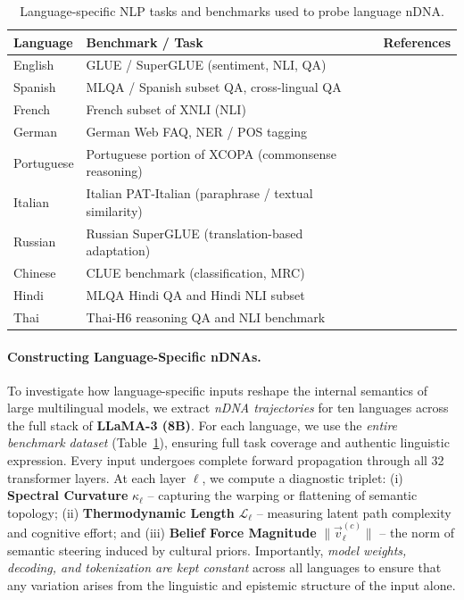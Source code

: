 \begin{table}[htbp]
\centering
\scriptsize
\caption{Language-specific NLP tasks and benchmarks used to probe language nDNA.}
\label{tab:ndna_lang_tasks}
\begin{tabular}{@{}p{2cm} p{4.5cm} p{5cm}@{}}
\toprule
\textbf{Language} & \textbf{Benchmark / Task} & \textbf{References} \\
\midrule
English & GLUE / SuperGLUE (sentiment, NLI, QA) & \cite{wang2018glue, wang2019superglue} \\
Spanish & MLQA / Spanish subset QA, cross-lingual QA & \cite{lewis2019mlqa, barrachina2019opus} \\
French & French subset of XNLI (NLI) & \cite{conneau2018xnli} \\
German & German Web FAQ, NER / POS tagging & \cite{ziems2016germaleval} \\
Portuguese & Portuguese portion of XCOPA (commonsense reasoning) & \cite{ponti2019xcopa} \\
Italian & Italian PAT-Italian (paraphrase / textual similarity) & \cite{ghaleb2020pat} \\
Russian & Russian SuperGLUE (translation-based adaptation) & \cite{russiansuperglue2021} \\
Chinese & CLUE benchmark (classification, MRC) & \cite{xu2020clue} \\
Hindi & MLQA Hindi QA and Hindi NLI subset & \cite{lewis2019mlqa} \\
Thai & Thai-H6 reasoning QA and NLI benchmark & \cite{turn0search3} \\
\bottomrule
\end{tabular}
\end{table}


\paragraph{Constructing Language-Specific nDNAs.}  
To investigate how language-specific inputs reshape the internal semantics of large multilingual models, we extract \emph{nDNA trajectories} for ten languages across the full stack of \textbf{LLaMA-3 (8B)}. For each language, we use the \emph{entire benchmark dataset} (Table~\ref{tab:ndna_lang_tasks}), ensuring full task coverage and authentic linguistic expression. Every input undergoes complete forward propagation through all 32 transformer layers. At each layer $\ell$, we compute a diagnostic triplet: (i) \textbf{Spectral Curvature} $\kappa_\ell$ -- capturing the warping or flattening of semantic topology; (ii) \textbf{Thermodynamic Length} $\mathcal{L}_\ell$ -- measuring latent path complexity and cognitive effort; and (iii) \textbf{Belief Force Magnitude} $\|\vec{v}_\ell^{(c)}\|$ -- the norm of semantic steering induced by cultural priors. Importantly, \emph{model weights, decoding, and tokenization are kept constant} across all languages to ensure that any variation arises from the linguistic and epistemic structure of the input alone. 




